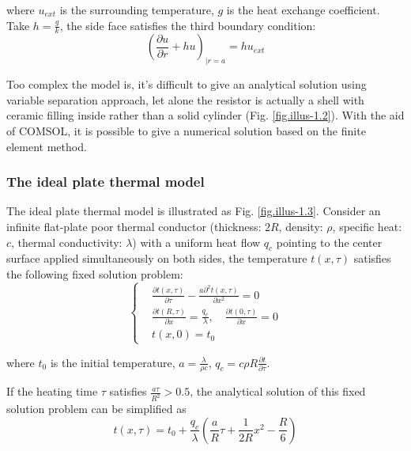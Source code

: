 \documentclass[10pt,a4paper,twocolumn,twoside,UTF8]{article}
\begin{document}
		where $u_{ext}$ is the surrounding temperature, $g$ is the heat exchange coefficient. Take $h=\frac{g}{k}$, the side face satisfies the third boundary condition:
		\begin{equation}
			(\frac{\partial u}{\partial r}+hu)_{|r=a} = hu_{ext}
			\label{eq.1.5}
		\end{equation}

		Too complex the model is, it's difficult to give an analytical solution using variable separation approach, 
		let alone the resistor is actually a shell with ceramic filling inside rather than a solid cylinder (Fig. \ref{fig.illus-1.2}). 
		With the aid of COMSOL, it is possible to give a numerical solution based on the finite element method.
		
		\subsubsection{The ideal plate thermal model}
		The ideal plate thermal model is illustrated as Fig. \ref{fig.illus-1.3}. 
		Consider an infinite flat-plate poor thermal conductor 
		(thickness: $2R$, density: $\rho$, specific heat: $c$, thermal conductivity: $\lambda$) with a uniform heat flow $q_c$ pointing to the center surface applied simultaneously on both sides, 
		the temperature $t(x, \tau)$ satisfies the following fixed solution problem:
		\begin{equation}
			\left\{
			\begin{aligned}
			&\frac{\partial t ( x , \tau )}{\partial \tau} - \frac{a \partial ^2 t ( x , \tau )}{\partial x^2} = 0\\
			&\frac{\partial t ( R , \tau )}{\partial x}=\frac{q_c}{\lambda}, \quad \frac{\partial t ( 0 , \tau )}{\partial x} = 0\\
			&t(x,0)=t_0
			\end{aligned}
			\right.
			\label{eq.2.1}
		\end{equation}

		where $t_0$ is the initial temperature, $a=\frac{\lambda}{\rho c}$, $q_c=c \rho R\frac{\partial t}{\partial \tau}$.

		If the heating time $\tau$ satisfies $\frac{a\tau}{R^2}>0.5$, the analytical solution of this fixed solution problem can be simplified as 
		\begin{equation}
			t(x,\tau)=t_0+\frac{q_c}{\lambda}\left(\frac{a}{R}\tau+\frac{1}{2R}x^2-\frac{R}{6}\right)
			\label{eq.2.2}
		\end{equation}	
		
\end{document}
